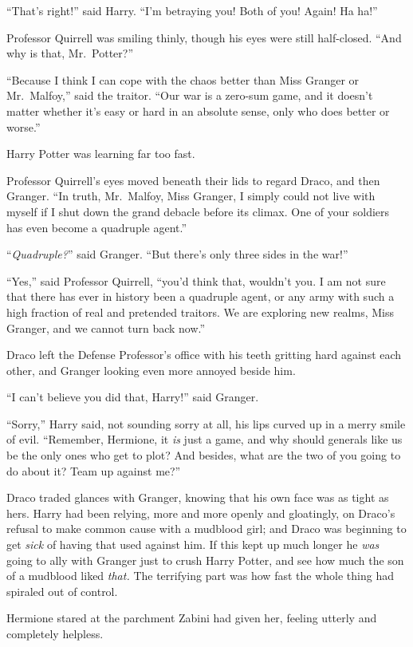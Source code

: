 “That’s right!” said Harry. “I’m betraying you! Both of you! Again! Ha ha!”

Professor Quirrell was smiling thinly, though his eyes were still half-closed. “And why is that, Mr.~Potter?”

“Because I think I can cope with the chaos better than Miss Granger or Mr.~Malfoy,” said the traitor. “Our war is a zero-sum game, and it doesn’t matter whether it’s easy or hard in an absolute sense, only who does better or worse.”

Harry Potter was learning far too fast.

Professor Quirrell’s eyes moved beneath their lids to regard Draco, and then Granger. “In truth, Mr.~Malfoy, Miss Granger, I simply could not live with myself if I shut down the grand debacle before its climax. One of your soldiers has even become a quadruple agent.”

“\emph{Quadruple?}” said Granger. “But there’s only three sides in the war!”

“Yes,” said Professor Quirrell, “you’d think that, wouldn’t you. I am not sure that there has ever in history been a quadruple agent, or any army with such a high fraction of real and pretended traitors. We are exploring new realms, Miss Granger, and we cannot turn back now.”

Draco left the Defense Professor’s office with his teeth gritting hard against each other, and Granger looking even more annoyed beside him.

“I can’t believe you did that, Harry!” said Granger.

“Sorry,” Harry said, not sounding sorry at all, his lips curved up in a merry smile of evil. “Remember, Hermione, it \emph{is} just a game, and why should generals like us be the only ones who get to plot? And besides, what are the two of you going to do about it? Team up against me?”

Draco traded glances with Granger, knowing that his own face was as tight as hers. Harry had been relying, more and more openly and gloatingly, on Draco’s refusal to make common cause with a mudblood girl; and Draco was beginning to get \emph{sick} of having that used against him. If this kept up much longer he \emph{was} going to ally with Granger just to crush Harry Potter, and see how much the son of a mudblood liked \emph{that.}
\sbreak
The terrifying part was how fast the whole thing had spiraled out of control.

Hermione stared at the parchment Zabini had given her, feeling utterly and completely helpless.

